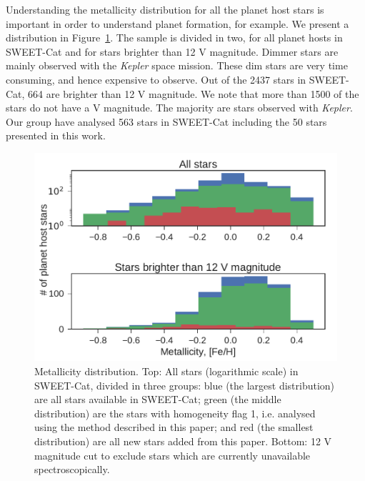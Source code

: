 \documentclass{aa}
\begin{document}
Understanding the metallicity distribution for all the planet host stars is
important in order to understand planet formation, for example. We present a
distribution in Figure~\ref{fig:distribution}. The sample is divided in two, for
all planet hosts in SWEET-Cat and for stars brighter than 12 V magnitude. Dimmer
stars are mainly observed with the \emph{Kepler} space mission. These dim stars
are very time consuming, and hence expensive to observe. Out of the 2437 stars
in SWEET-Cat, 664 are brighter than 12 V magnitude. We note that more than 1500
of the stars do not have a V magnitude. The majority are stars observed with
\emph{Kepler}. Our group have analysed 563 stars in SWEET-Cat including the 50
stars presented in this work.


\begin{figure}[tpb]
    \centering
    \includegraphics[width=1.0\linewidth,natwidth=450,natheight=300]{figures/metallicityDistribution.pdf}
    \caption{Metallicity distribution. Top: All
             stars (logarithmic scale) in SWEET-Cat, divided in three groups: blue
             (the largest distribution) are all stars available in SWEET-Cat;
             green (the middle distribution) are the stars with homogeneity flag
             1, i.e. analysed using the method described in this paper; and red
             (the smallest distribution) are all new stars added from this
             paper. Bottom: 12 V magnitude cut to exclude
             stars which are currently unavailable spectroscopically.}
    \label{fig:distribution}
\end{figure}
\end{document}
